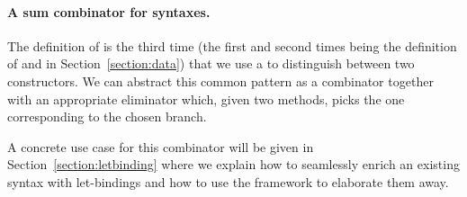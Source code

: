 \paragraph{A sum combinator for syntaxes.}\label{desccomb}

The definition of  is the third time (the first and second
times being the definition of  and  in
Section~\ref{section:data}) that we use a  to distinguish
between two constructors. We can abstract this common pattern as a combinator  together
with an appropriate eliminator  which, given two methods,
picks the one corresponding to the chosen branch.

\begin{center}
\begin{minipage}[t]{0.35\textwidth}
\end{minipage}\hfill
\begin{minipage}[t]{0.55\textwidth}
\end{minipage}
\end{center}



A concrete use case for this combinator will be given in
Section~\ref{section:letbinding}
where we explain how to seamlessly enrich an existing syntax with let-bindings
and how to use the \semrec{} framework to elaborate them away.


